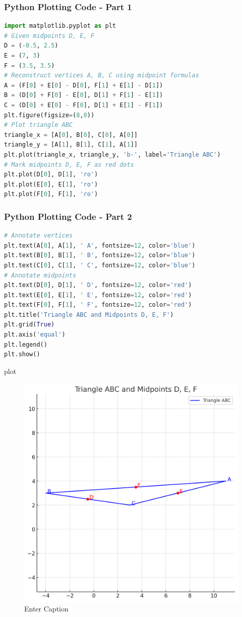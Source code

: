 \documentclass{beamer}
\begin{document}
\begin{frame}[fragile]

\frametitle{\textbf{Python Plotting Code - Part 1}}
\begin{lstlisting}[language=Python]
import matplotlib.pyplot as plt
# Given midpoints D, E, F
D = (-0.5, 2.5)
E = (7, 3)
F = (3.5, 3.5)
# Reconstruct vertices A, B, C using midpoint formulas
A = (F[0] + E[0] - D[0], F[1] + E[1] - D[1])
B = (D[0] + F[0] - E[0], D[1] + F[1] - E[1])
C = (D[0] + E[0] - F[0], D[1] + E[1] - F[1])
plt.figure(figsize=(8,8))
# Plot triangle ABC
triangle_x = [A[0], B[0], C[0], A[0]]
triangle_y = [A[1], B[1], C[1], A[1]]
plt.plot(triangle_x, triangle_y, 'b-', label='Triangle ABC')
# Mark midpoints D, E, F as red dots
plt.plot(D[0], D[1], 'ro')
plt.plot(E[0], E[1], 'ro')
plt.plot(F[0], F[1], 'ro')

\end{lstlisting}
\end{frame}
\begin{frame}[fragile]

\frametitle{\textbf{Python Plotting Code - Part 2}}
\begin{lstlisting}[language=Python]
    # Annotate vertices
plt.text(A[0], A[1], ' A', fontsize=12, color='blue')
plt.text(B[0], B[1], ' B', fontsize=12, color='blue')
plt.text(C[0], C[1], ' C', fontsize=12, color='blue')
# Annotate midpoints
plt.text(D[0], D[1], ' D', fontsize=12, color='red')
plt.text(E[0], E[1], ' E', fontsize=12, color='red')
plt.text(F[0], F[1], ' F', fontsize=12, color='red')
plt.title('Triangle ABC and Midpoints D, E, F')
plt.grid(True)
plt.axis('equal')
plt.legend()
plt.show()


\end{lstlisting}
\end{frame}
\begin{frame}{plot}
\begin{figure}
    \centering
    \includegraphics[width=0.7\linewidth]{figs/area.png}
    \caption{Enter Caption}
    \label{fig:placeholder}
\end{figure}
    
\end{frame}
\end{document}
